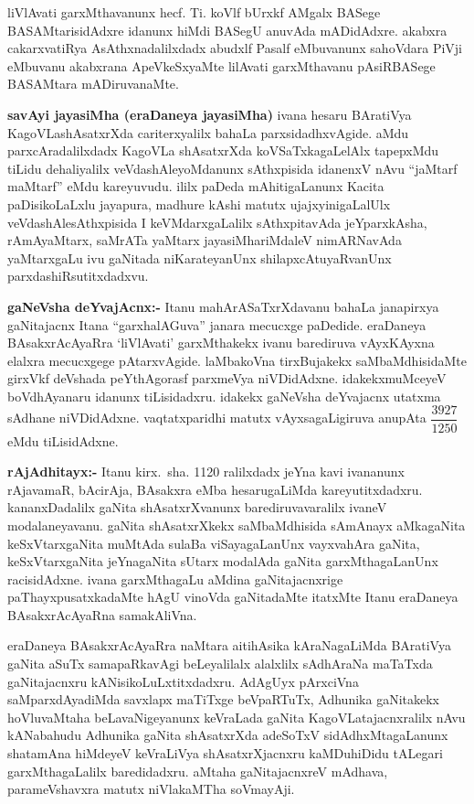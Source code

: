 liVlAvati garxMthavanunx hecf. Ti. koVlf bUrxkf AMgalx BASege BASAMtarisidAdxre idanunx hiMdi BASegU anuvAda mADidAdxre. akabxra cakarxvatiRya AsAthxna\-dalilxdadx abudxlf Pasalf eMbuvanunx sahoVdara PiVji eMbuvanu akabxrana ApeVkeSxyaMte lilAvati garxMthavanu pAsiRBASege BASAMtara mADiruvanaMte.

\textbf{savAyi jayasiMha (eraDaneya jayasiMha)}
ivana hesaru BAratiVya KagoVLashAsatxrXda cariterxyalilx bahaLa parxsidadhxvAgide. aMdu parxcAradalilxdadx KagoVLa shAsatxrXda koVSaTxkagaLelAlx tapepxMdu tiLidu dehaliyalilx veVdashAleyoMdanunx sAthxpisida idanenxV nAvu ``jaMtarf maMtarf'' eMdu kareyuvudu. 
ililx paDeda mAhiti\-gaLanunx Kacita paDisikoLaLxlu jayapura, madhure kAshi matutx ujajxyinigaLalUlx veVdashAlesAthxpisida I keVMdarxgaLalilx sAthxpitavAda jeYparxkAsha, rAmAyaMtarx, saMrATa yaMtarx jayasiMhariMdaleV nimARNavAda yaMtarxgaLu ivu gaNitada niKarateyanUnx shilapxcAtuyaRvanUnx parxdashiRsutitxdadxvu.

\textbf{gaNeVsha deYvajAcnx:-} Itanu mahArASaTxrXdavanu bahaLa janapirxya gaNitajacnx Itana ``garxhalAGuva'' janara mecucxge paDedide. eraDaneya BAsakxrAcAyaRra `liVlAvati' garxMthakekx ivanu barediruva vAyxKAyxna elalxra mecucxgege pAtarxvAgide. laMbakoVna tirxBujakekx saMbaMdhisidaMte girxVkf deVshada peYthAgorasf parxmeVya niVDidAdxne. idakekx\break muMceyeV boVdhAyanaru idanunx tiLisidadxru. idakekx gaNeVsha deYvajacnx utatxma sAdhane niVDidAdxne.
vaqtatxparidhi matutx vAyxsagaLigiruva anupAta $\dfrac{3927}{1250}$ eMdu tiLisidAdxne.

\textbf{rAjAdhitayx:-} Itanu kirx.~sha. {\rm 1120} ralilxdadx jeYna kavi ivananunx rAjavamaR, bAcirAja, BAsakxra eMba hesarugaLiMda kareyutitxdadxru. kananxDadalilx gaNita shAsatxrXvanunx barediruvavaralilx ivaneV modalaneyavanu. gaNita shAsatxrXkekx saMbaMdhisida sAmAnayx aMkagaNita keSxVtarxgaNita muMtAda sulaBa viSayagaLanUnx vayxvahAra gaNita, keSxVtarxgaNita jeYnagaNita sUtarx modalAda gaNita garxMthagaLanUnx racisidAdxne. ivana garxMthagaLu aMdina gaNitajacnxrige paThayxpusatxkadaMte hAgU vinoVda gaNitadaMte itatxMte Itanu eraDaneya BAsakxrAcAyaRna samakAliVna.

eraDaneya BAsakxrAcAyaRra naMtara aitihAsika kAraNagaLiMda BAratiVya gaNita aSuTx samapaRkavAgi beLeyalilalx alalxlilx sAdhAraNa maTaTxda gaNitajacnxru kANisikoLuLxtitxdadxru. AdAgUyx pArxciVna saMparxdAyadiMda savxlapx maTiTxge beVpaRTuTx, Adhunika gaNitakekx hoVluvaMtaha beLavaNigeyanunx keVraLada gaNita KagoVLatajacnxralilx nAvu kANabahudu Adhunika gaNita shAsatxrXda adeSoTxV sidAdhxMtagaLanunx shatamAna hiMdeyeV keVraLiVya shAsatxrXjacnxru kaMDuhiDidu tALegari garxMthagaLalilx baredidadxru. aMtaha gaNitajacnxreV mAdhava, parameVshavxra matutx niVlakaMTha soVmayAji.

